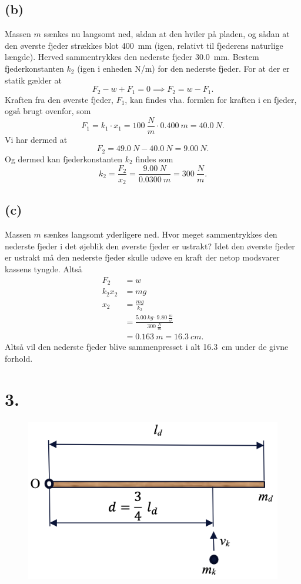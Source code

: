 \documentclass[12pt]{article}
\theoremstyle{definition}
\begin{document}
\subsection*{(b)}
Massen $m$ sænkes nu langsomt ned, sådan at den hviler på pladen, og sådan at den øverste fjeder strækkes blot \qty{400}{mm} (igen, relativt til fjederens naturlige længde). Herved sammentrykkes den nederste fjeder \qty{30,0}{mm}. Bestem fjederkonstanten $k_2$ (igen i enheden \unit{N/m}) for den nederste fjeder.
\bigbreak
For at der er statik gælder at
\[ 
F_2 - w + F_1 = 0 \implies F_2 = w - F_1
.\]
Kraften fra den øverste fjeder, $F_1$, kan findes vha. formlen for kraften i en fjeder, også brugt ovenfor, som
\[ 
F_1 = k_1 \cdot x_1 = \qty{100}{\frac{N}{m}} \cdot \qty{0,400}{m} = \qty{40,0}{N} 
.\]
Vi har dermed at
\[ 
F_2 = \qty{49,0}{N} - \qty{40,0}{N} = \qty{9,00}{N} 
.\]
Og dermed kan fjederkonstanten $k_2$ findes som
\[ 
k_2 = \frac{F_2}{x_2} = \frac{\qty{9,00}{N}}{\qty{0,0300}{m}} = \qty{300}{\frac{N}{m}} 
.\]




\subsection*{(c)}
Massen $m$ sænkes langsomt yderligere ned. Hvor meget sammentrykkes den nederste fjeder i det øjeblik den øverste fjeder er ustrakt?
\bigbreak
Idet den øverste fjeder er ustrakt må den nederste fjeder skulle udøve en kraft der netop modsvarer kassens tyngde. Altså 
\begin{align*}
  F_2 &= w \\
  k_2x_2 &= mg \\
  x_2 &= \frac{mg}{k_2} \\
  &= \frac{\qty{5,00}{kg} \cdot \qty{9,80}{\frac{m}{s^2}} }{\qty{300}{\frac{N}{m}} } \\
  &= \qty{0,163}{m} = \qty{16,3}{cm}
.\end{align*}
Altså vil den nederste fjeder blive sammenpresset i alt \qty{16,3}{cm} under de givne forhold.

\section*{3.}
\begin{figure} [ht]
  \centering
  \caption{}
  \includegraphics[width=0.4\linewidth]{../figures/Ek_21_2.png}
  \label{fig:Ek_21_2}
\end{figure}
\end{document}
